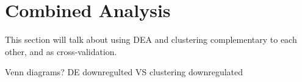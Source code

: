  



\section{Combined Analysis}

This section will talk about using DEA and clustering complementary to each other, and as cross-validation. 

Venn diagrams? DE downregulted VS clustering downregulated


